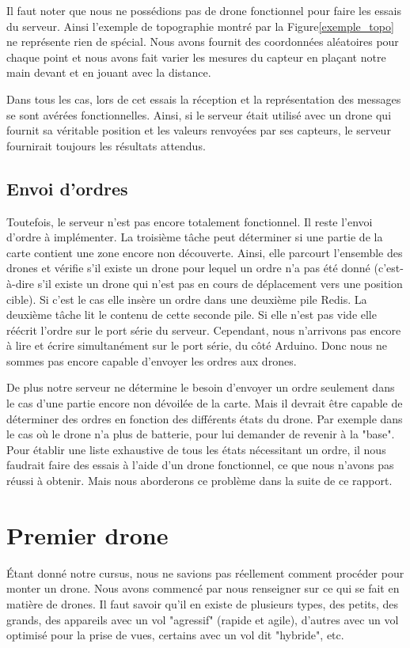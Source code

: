 \documentclass[a4paper,10pt]{report}
\begin{document}
      Il faut noter que nous ne possédions pas de drone fonctionnel pour faire 
les essais du serveur. Ainsi l'exemple de topographie montré par la 
Figure\ref{exemple_topo} ne représente rien de spécial. Nous avons fournit des 
coordonnées aléatoires pour chaque point et nous avons fait varier les mesures 
du capteur en plaçant notre main devant et en jouant avec la distance.

      Dans tous les cas, lors de cet essais la réception et la représentation 
des messages se sont avérées fonctionnelles. Ainsi, si le serveur était utilisé 
avec un drone qui fournit sa véritable position et les valeurs renvoyées par 
ses capteurs, le serveur fournirait toujours les résultats attendus.

    \section{Envoi d'ordres}
      Toutefois, le serveur n'est pas encore totalement fonctionnel. Il reste 
l'envoi d'ordre à implémenter. La troisième tâche peut déterminer si une partie 
de la carte contient une zone encore non découverte. Ainsi, elle parcourt 
l'ensemble des drones et vérifie s'il existe un drone pour lequel un ordre n'a 
pas été donné (c'est-à-dire s'il existe un drone qui n'est pas en cours de 
déplacement vers une position cible). Si c'est le cas elle insère un ordre dans 
une deuxième pile Redis. La deuxième tâche lit le contenu de cette seconde 
pile. Si elle n'est pas vide elle réécrit l'ordre sur le port série du serveur. 
Cependant, nous n'arrivons pas encore à lire et écrire simultanément sur le 
port série, du côté Arduino. Donc nous ne sommes pas encore capable d'envoyer 
les ordres aux drones.

      De plus notre serveur ne détermine le besoin d'envoyer un ordre seulement 
dans le cas d'une partie encore non dévoilée de la carte. Mais il devrait être 
capable de déterminer des ordres en fonction des différents états du drone. Par 
exemple dans le cas où le drone n'a plus de batterie, pour lui demander de 
revenir à la "base". Pour établir une liste exhaustive de tous les états 
nécessitant un ordre, il nous faudrait faire des essais à l'aide d'un drone 
fonctionnel, ce que nous n'avons pas réussi à obtenir. Mais nous aborderons ce 
problème dans la suite de ce rapport.
	

  \chapter{Premier drone}
    Étant donné notre cursus, nous ne savions pas réellement comment procéder 
pour monter un drone. Nous avons commencé par nous renseigner sur ce qui se 
fait en matière de drones. Il faut savoir qu'il en existe de plusieurs types, 
des petits, des grands, des appareils avec un vol "agressif" (rapide et agile), 
d'autres avec un vol optimisé pour la prise de vues, certains avec un vol dit 
"hybride", etc.
    
\end{document}
